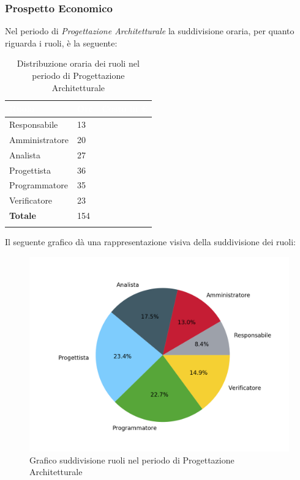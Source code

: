 \subsubsection{Prospetto Economico}
Nel periodo di \textit{Progettazione Architetturale} la suddivisione oraria, per quanto riguarda i ruoli, è la seguente: 


\begin{longtable}{| C{.30\textwidth}| C{.15\textwidth}| C{.20\textwidth}|}
\hline
{}\textbf{\textcolor{white}{Ruolo}} & \textbf{\textcolor{white}{Ore}} & \textbf{\textcolor{white}{Costo in \euro}} \\
\hline 
Responsabile & 13 &  \\
\hline
{}Amministratore & 20 & \\
\hline
Analista & 27 &  \\
\hline
{}Progettista & 36 &  \\
\hline
Programmatore & 35 &  \\
\hline
{}Verificatore & 23 &  \\
\hline
\textbf{Totale} & 154 & \\ 
\hline

\caption{Distribuzione oraria dei ruoli nel periodo di Progettazione Architetturale}
\label{Distribuzione oraria per ruoli del periodo di pa}
\end{longtable}

Il seguente grafico dà una rappresentazione visiva della suddivisione dei ruoli:
\begin{figure}[H]
	\centering
  		\includegraphics[width=1\linewidth]{./images/torta_pa.png}
  		\caption{Grafico suddivisione ruoli nel periodo di Progettazione Architetturale}
  		\label{fig:grafico suddivione ruoli pa}
\end{figure}


